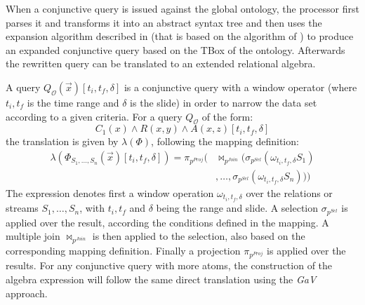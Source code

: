 When a conjunctive query is issued against the global ontology, the processor first parses it and transforms it into an
abstract syntax tree and then uses the expansion algorithm described in \cite{Barrasa_04} (that is based on the
 algorithm of \cite{Calvanese_05}) to produce an expanded conjunctive query based on the TBox of the
ontology. Afterwards the rewritten query can be translated to an extended relational algebra.

A query $Q_{\mathcal{O}}(\vec{x})[t_i,t_f,\delta]$ is a conjunctive query with a window operator (where $t_i,t_f$ is
the time range and $\delta$ is the slide) in order to narrow the data set according to a given criteria. For a query
$Q_{\mathcal{O}}$ of the form:
\begin{equation*}
C_1(x) \wedge R(x,y) \wedge A(x,z) [t_i,t_f,\delta]
\end{equation*}
the translation is given by $\lambda(\Phi)$, following the mapping definition:
\begin{align*}
\lambda(\Phi_{S_1,\ldots,S_n}(\vec{x})[t_i,t_f,\delta])=\pi_{p^{Proj}}(& \Join_{p^{Join}}
(\sigma_{p^{Sel}}(\omega_{t_i,t_f,\delta}S_1) \\ 
& ,\dots,\sigma_{p^{Sel}}(\omega_{t_i,t_f,\delta}S_n)))
\end{align*}
The expression denotes first a window operation $\omega_{t_i,t_f,\delta}$ over the relations or streams $S_1,\dots
,S_n$, with $t_i,t_f$ and $\delta$ being the range and slide. A selection $\sigma_{p^{Sel}}$ is applied over the
result, according the conditions defined in the mapping.  A multiple join $\Join_{p^{Join}}$ is then applied to the
selection, also based on the corresponding mapping definition. Finally a projection $\pi_{p^{Proj}}$ is applied over
the results. For any conjunctive query with more atoms, the construction of the algebra expression will follow the same
direct translation using the \textit{GaV} approach.
%
